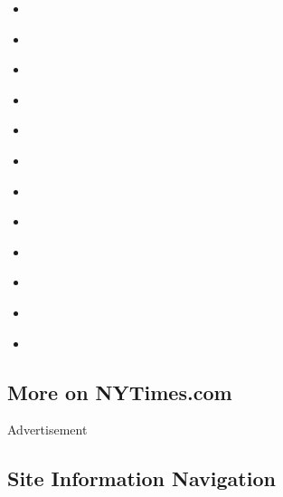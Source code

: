 \begin{itemize}
\item
  \href{https://www.nytimes3xbfgragh.onion/interactive/2018/06/07/magazine/new-york-love-three-kids.html}{}
\item
  \href{https://www.nytimes3xbfgragh.onion/interactive/2018/06/07/magazine/new-york-love-couples-40-years-together.html}{}
\item
  \href{https://www.nytimes3xbfgragh.onion/interactive/2018/06/07/magazine/new-york-love-city.html\#bed-stuy-4-22-pm}{}
\item
  \href{https://www.nytimes3xbfgragh.onion/interactive/2018/06/07/magazine/new-york-love-city.html\#gramercy-park-5-20-pm}{}
\item
  \href{https://www.nytimes3xbfgragh.onion/interactive/2018/06/07/magazine/new-york-love-rikers-jail-visit.html}{}
\item
  \href{https://www.nytimes3xbfgragh.onion/interactive/2018/06/07/magazine/new-york-love-city.html\#red-hook-6-16-pm}{}
\item
  \href{https://www.nytimes3xbfgragh.onion/interactive/2018/06/07/magazine/new-york-love-separation.html}{}
\item
  \href{https://www.nytimes3xbfgragh.onion/interactive/2018/06/07/magazine/new-york-love-city.html\#bed-stuy-8-37-pm}{}
\item
  \href{https://www.nytimes3xbfgragh.onion/interactive/2018/06/07/magazine/new-york-love-city.html\#flatiron-9-21-pm}{}
\item
  \href{https://www.nytimes3xbfgragh.onion/interactive/2018/06/07/magazine/new-york-love-city.html\#bronx-center-9-25-pm}{}
\item
  \href{https://www.nytimes3xbfgragh.onion/interactive/2018/06/07/magazine/new-york-love-city.html\#bushwick-11-27-pm}{}
\item
  \href{https://www.nytimes3xbfgragh.onion/interactive/2018/06/07/magazine/new-york-love-lost-husband-grief.html}{}
\end{itemize}

\hypertarget{more-on-nytimescom}{%
\subsection{More on NYTimes.com}\label{more-on-nytimescom}}

Advertisement

\hypertarget{site-information-navigation}{%
\subsection{Site Information
Navigation}\label{site-information-navigation}}

